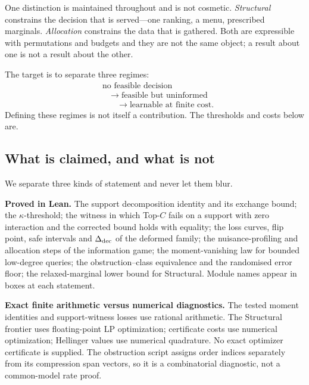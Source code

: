One distinction is maintained throughout and is not cosmetic. \emph{Structural} constrains
the decision that is served---one ranking, a menu, prescribed marginals. \emph{Allocation}
constrains the data that is gathered. Both are expressible with permutations and budgets
and they are not the same object; a result about one is not a result about the other.

The target is to separate three regimes:
\begin{equation}
\begin{aligned}
&\text{no feasible decision}\\
&\quad\to\;\text{feasible but uninformed}\\
&\qquad\to\;\text{learnable at finite cost.}
\end{aligned}
\label{eq:regimes}
\end{equation}
Defining these regimes is not itself a contribution. The thresholds and costs below are.

\subsection{What is claimed, and what is not}

We separate three kinds of statement and never let them blur.

\textbf{Proved in Lean.} The support decomposition identity and its exchange bound; the
$\kappa$-threshold; the witness in which Top-$C$ fails on a support with zero interaction
and the corrected bound holds with equality; the loss curves, flip point, safe intervals
and $\Delta_{\rm dec}$ of the deformed family; the nuisance-profiling and allocation steps
of the information game; the moment-vanishing law for bounded low-degree queries; the
obstruction--class equivalence and the randomised error floor; the relaxed-marginal
lower bound for Structural. Module names appear in \leanbox{} boxes at each statement.

\textbf{Exact finite arithmetic versus numerical diagnostics.} The tested moment
identities and support-witness losses use rational arithmetic. The Structural frontier
uses floating-point LP optimization; certificate costs use numerical optimization; Hellinger
values use numerical quadrature. No exact optimizer certificate is supplied. The obstruction
script assigns order indices separately from its compression span vectors, so it is a
combinatorial diagnostic, not a common-model rate proof.

